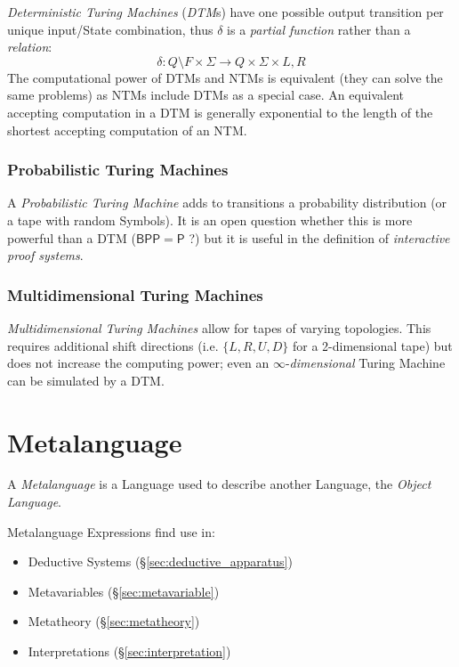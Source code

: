 \emph{Deterministic Turing Machines} (\emph{DTM}s) have one possible
output transition per unique input/State combination, thus $\delta$ is
a \emph{partial function} rather than a \emph{relation}:
\[
    \delta : Q \setminus F \times \Sigma \rightarrow Q \times
    \Sigma \times {L,R}
\]
The computational power of DTMs and NTMs is equivalent (they can solve
the same problems) as NTMs include DTMs as a special case. An
equivalent accepting computation in a DTM is generally exponential to
the length of the shortest accepting computation of an NTM.



\subsubsection{Probabilistic Turing Machines}

A \emph{Probabilistic Turing Machine} adds to transitions a
probability distribution (or a tape with random Symbols). It is an
open question whether this is more powerful than a DTM
($\mathsf{BPP}=\mathsf{P}$ ?)  but it is useful in the definition of
\emph{interactive proof systems}. %



\subsubsection{Multidimensional Turing Machines}

\emph{Multidimensional Turing Machines} allow for tapes of varying
topologies. This requires additional shift directions (i.e. $\{L, R, U,
D\}$ for a 2-dimensional tape) but does not increase the computing
power; even an $\infty$-\emph{dimensional} Turing Machine can be
simulated by a DTM.



\section{Metalanguage}\label{sec:metalanguage}

A \emph{Metalanguage} is a Language used to describe another Language,
the \emph{Object Language}.

Metalanguage Expressions find use in:
\begin{itemize}
    \item Deductive Systems (\S\ref{sec:deductive_apparatus})
    \item Metavariables (\S\ref{sec:metavariable})
    \item Metatheory (\S\ref{sec:metatheory})
    \item Interpretations (\S\ref{sec:interpretation})
\end{itemize}

